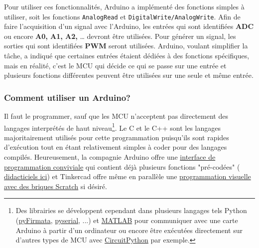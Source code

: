 \documentclass[english,french,12pt]{article}
\begin{document}
 Pour utiliser ces fonctionnalités, Arduino a implémenté des fonctions simples à utiliser, soit les fonctions \texttt{AnalogRead}  et \texttt{DigitalWrite/AnalogWrite}. Afin de faire l’acquisition d’un signal avec l’Arduino, les entrées qui sont identifiées \textbf{ADC} ou encore \textbf{A0, A1, A2,} … devront être utilisées. Pour générer un signal, les sorties qui sont identifiées \textbf{PWM} seront utilisées. Arduino, voulant simplifier la tâche, a indiqué que certaines entrées étaient dédiées à des fonctions spécifiques, mais en réalité, c’est le MCU qui décide ce qui se passe sur une entrée et plusieurs fonctions différentes peuvent être utilisées sur une seule et même entrée.
 
\subsubsection*{Comment utiliser un Arduino?}
Il faut le programmer, sauf que les MCU n'acceptent pas directement des langages interprétés de haut niveau\footnote{Des librairies se développent cependant dans plusieurs langages tels Python (\href{https://github.com/tino/pyFirmata}{pyFirmata}, \href{https://pypi.org/project/pyserial/}{pyserial}, ...) et \href{https://www.mathworks.com/help/supportpkg/arduinoio/examples/getting-started-with-matlab-support-package-for-arduino-hardware.html}{MATLAB} pour communiquer avec une carte Arduino à partir d'un ordinateur ou encore être exécutées directement sur d'autres types de MCU avec \href{https://www.digikey.ca/en/maker/blogs/2018/python-on-hardware}{CircuitPython} par exemple.}. Le C et le C++ sont les langages majoritairement utilisés pour cette programmation puisqu’ils sont rapides d’exécution tout en étant relativement simples à coder pour des langages compilés. Heureusement, la compagnie Arduino offre une \href{https://www.arduino.cc/en/software}{interface de programmation conviviale} qui contient déjà plusieurs fonctions "pré-codées" (\href{https://www.arduino.cc/en/Tutorial/BuiltInExamples}{
didacticiels ici}) et Tinkercad offre même en parallèle une \href{https://scientiffic.medium.com/tinkercad-circuits-code-blocks-9953d47b5a3f}{programmation visuelle avec des briques Scratch} si désiré. 
\end{document}

